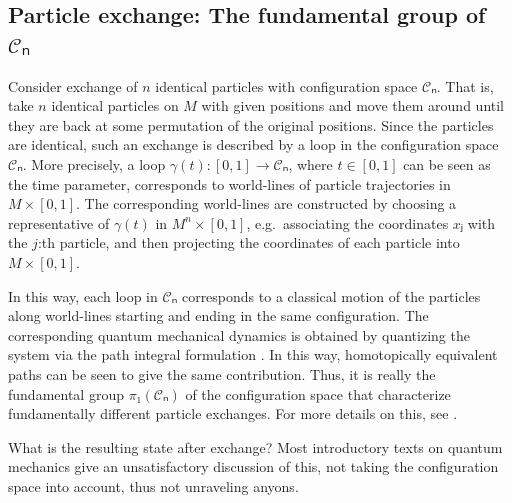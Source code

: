 \subsection{Particle exchange: The fundamental group of \texorpdfstring{$𝒞ₙ$}{C\_n}}

Consider exchange of $n$ identical particles with configuration space $𝒞ₙ$. That is, take $n$ identical particles on $M$ with given positions and move them around until they are back at some permutation of the original positions. Since the particles are identical, such an exchange is described by a loop in the configuration space $𝒞ₙ$. More precisely, a loop $γ(t) : [0,1] → 𝒞ₙ$, where $t ∈ [0,1]$ can be seen as the time parameter, corresponds to world-lines of particle trajectories in $M×[0,1]$. The corresponding world-lines are constructed by choosing a representative of $γ(t)$ in $M^n×[0,1]$, e.g.\ associating the coordinates $xⱼ$ with the $j$:th particle, and then projecting the coordinates of each particle into $M×[0,1]$.

In this way, each loop in $𝒞ₙ$ corresponds to a classical motion of the particles along world-lines starting and ending in the same configuration. The corresponding quantum mechanical dynamics is obtained by quantizing the system via the path integral formulation \cite{feynmann path integral,nakahara,feynmann path integrals indistinguishable particles,myrheim}. In this way, homotopically equivalent paths can be seen to give the same contribution. Thus, it is really the fundamental group $π₁(𝒞ₙ)$ of the configuration space that characterize fundamentally different particle exchanges. For more details on this, see \cite{configuration spaces,bonderson}.

What is the resulting state after exchange? Most introductory texts on quantum mechanics give an unsatisfactory discussion of this, not taking the configuration space into account, thus not unraveling anyons.

